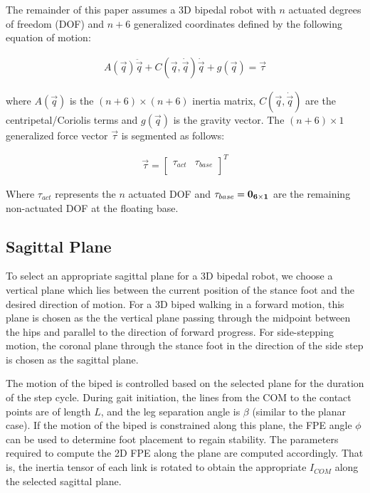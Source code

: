 The remainder of this paper assumes a 3D bipedal robot with $n$ actuated degrees of freedom (DOF) and $n+6$ generalized coordinates defined by the following equation of motion:

\begin{eqnarray}
	\label{eq:eom}
	A(\vec{q})\ddot{\vec{q}} + C(\vec{q},\dot{\vec{q}})\dot{\vec{q}} + g(\vec{q}) = \vec{\tau}
\end{eqnarray}

where $A(\vec{q})$ is the $(n+6) \times (n+6)$ inertia matrix, $C(\vec{q},\dot{\vec{q}})$ are the centripetal/Coriolis terms and $g(\vec{q})$ is the gravity vector. The $(n+6) \times 1$ generalized force vector $\vec{\tau}$ is segmented as follows:

\begin{eqnarray}
	\label{eq:gentau}
	\vec{\tau} = {\begin{bmatrix} \tau_{act} & \tau_{base} \\ \end{bmatrix}}^T
\end{eqnarray}

Where $\tau_{act}$ represents the $n$ actuated DOF and $\tau_{base} = \bf{0}_{6 \times 1} $ are the remaining non-actuated DOF at the floating base.

\subsection{Sagittal Plane} %
\label{sub:sagittal_plane}
To select an appropriate sagittal plane for a 3D bipedal robot, we choose a vertical plane which lies between the current position of the stance foot and the desired direction of motion. For a 3D biped walking in a forward motion, this plane is chosen as the the vertical plane passing through the midpoint between the hips and parallel to the direction of forward progress. For side-stepping motion, the coronal plane through the stance foot in the direction of the side step is chosen as the sagittal plane.

The motion of the biped is controlled based on the selected plane for the duration of the step cycle. During gait initiation, the lines from the COM to the contact points are of length $L$, and the leg separation angle is $\beta$ (similar to the planar case). If the motion of the biped is constrained along this plane, the FPE angle $\phi$ can be used to determine foot placement to regain stability. The parameters required to compute the 2D FPE along the plane are computed accordingly. That is, the inertia tensor of each link is rotated to obtain the appropriate $I_{COM}$ along the selected sagittal plane.

